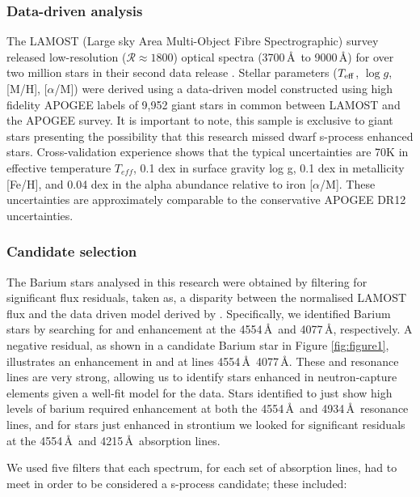 \documentclass[a4paper,fleqn,usenatbib]{mnras}
\begin{document}
\subsubsection{Data-driven analysis}
The LAMOST (Large sky Area Multi-Object Fibre Spectrographic) survey released low-resolution ($\mathcal{R} \approx 1800$) optical spectra (3700\,\AA\ to 9000\,\AA) for over two million stars in their second data release \citep{luo2015}. Stellar parameters ($T_{\rm eff}$, $\log{g}$, [M/H], [$\alpha$/M]) were derived using a data-driven model constructed using high fidelity APOGEE labels of 9,952 giant stars in common between LAMOST and the APOGEE survey. It is important to note, this sample is exclusive to giant stars presenting the possibility that this research missed dwarf s-process enhanced stars. Cross-validation experience shows that the typical uncertainties are 70K in effective temperature $T_{eff}$, 0.1 dex in surface gravity log g, 0.1 dex in metallicity [Fe/H], and 0.04 dex in the alpha abundance relative to iron [$\alpha$/M]. These uncertainties are approximately comparable to the conservative APOGEE DR12 uncertainties.


\subsubsection{Candidate selection} \label{sec:cand}
The Barium stars analysed in this research were obtained by filtering for significant flux residuals, taken as, a disparity between the normalised LAMOST flux and the data driven model derived by \citet{ho2017}. Specifically, we identified Barium stars by searching for  and  enhancement at the 4554\,\AA\ and 4077\,\AA, respectively. A negative residual, as shown in a candidate Barium star in Figure \ref{fig:figure1}, illustrates an enhancement in  and  at lines 4554\,\AA\, 4077\,\AA. These  and  resonance lines are very strong, allowing us to identify stars enhanced in neutron-capture elements given a well-fit model for the data. Stars identified to just show high levels of barium required enhancement at both the 4554\,\AA\ and 4934\,\AA\ resonance lines, and for stars just enhanced in strontium we looked for significant residuals at the 4554\,\AA\ and 4215\,\AA\ absorption lines.  

We used five filters that each spectrum, for each set of absorption lines, had to meet in order to be considered a s-process candidate; these included:

\renewcommand\labelenumi{(\roman{enumi})}
\renewcommand\theenumi\labelenumi
\end{document}
